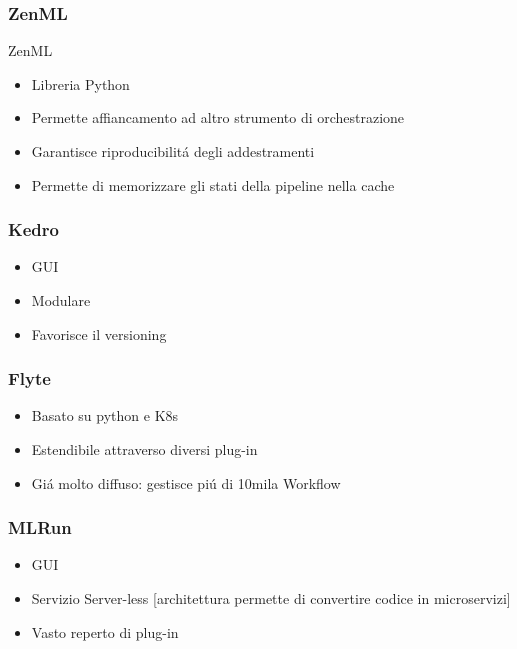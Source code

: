 \documentclass[xcolor=dvipsnames]{beamer}
\begin{document}
\begin{frame}
    \frametitle{ZenML}
   ZenML
    \begin{itemize}
        \item Libreria Python
        \item Permette affiancamento ad altro strumento di orchestrazione
        \item Garantisce riproducibilitá degli addestramenti
        \item Permette di memorizzare gli stati della pipeline nella cache %
    \end{itemize}
\end{frame}
\begin{frame}
    \frametitle{Kedro}
    \begin{itemize}
        \item GUI
        \item Modulare
        \item Favorisce il versioning
    \end{itemize}
\end{frame}
\begin{frame}
    \frametitle{Flyte}
\begin{itemize}
    \item Basato su python e K8s
    \item Estendibile attraverso diversi plug-in
    \item Giá molto diffuso: gestisce piú di 10mila Workflow
\end{itemize}
\end{frame}
\begin{frame}
    \frametitle{MLRun}
    \begin{itemize}
        \item GUI 
        \item Servizio Server-less [architettura permette di convertire codice in microservizi]
        \item Vasto reperto di plug-in
    \end{itemize}
\end{frame}
\end{document}
